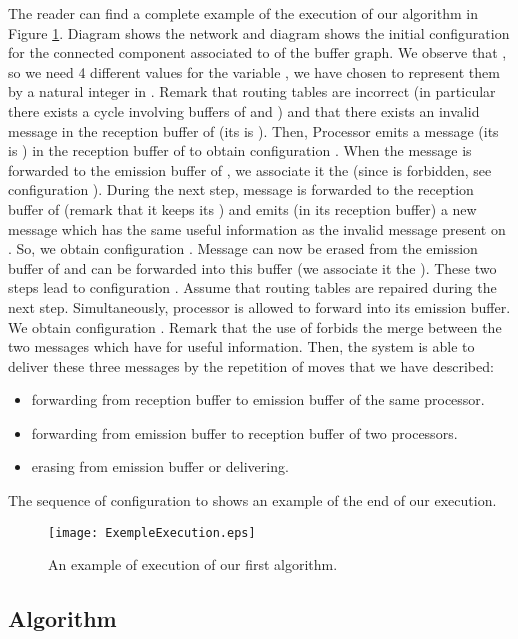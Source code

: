 \documentclass[11pt]{article}
\begin{document}
The reader can find a complete example of the execution of our algorithm in Figure \ref{fig:ExempleExecution}. Diagram  shows the network and diagram  shows the initial configuration for the connected component associated to  of the buffer graph. We observe that , so we need 4 different values for the variable , we have chosen to represent them by a natural integer in .  Remark that routing tables are incorrect (in particular there exists a cycle involving buffers of  and ) and that there exists an invalid message  in the reception buffer of  (its  is ). Then, Processor  emits a message  (its  is ) in the reception buffer of  to obtain configuration . When the message  is forwarded to the emission buffer of , we associate it the   (since  is forbidden, see configuration ). During the next step, message  is forwarded to the reception buffer of  (remark that it keeps its ) and  emits (in its reception buffer) a new message  which has the same useful information as the invalid message present on . So, we obtain configuration . Message  can now be erased from the emission buffer of  and  can be forwarded into this buffer (we associate it the  ). These two steps lead to configuration . Assume that routing tables are repaired during the next step. Simultaneously, processor  is allowed to forward  into its emission buffer. We obtain configuration . Remark that the use of  forbids the merge between the two messages which have  for useful information. Then, the system is able to deliver these three messages by the repetition of moves that we have described: 
\begin{itemize}
\item forwarding from reception buffer to emission buffer of the same processor.
\item forwarding from emission buffer to reception buffer of two processors.
\item erasing from emission buffer or delivering.
\end{itemize}
The sequence of configuration  to  shows an example of the end of our execution.

\begin{figure}
\noindent \begin{centering}
\texttt{[image: ExempleExecution.eps]}
\par\end{centering}
\caption{\label{fig:ExempleExecution}An example of execution of our first algorithm.}
\end{figure}

\subsection{Algorithm}
\end{document}
